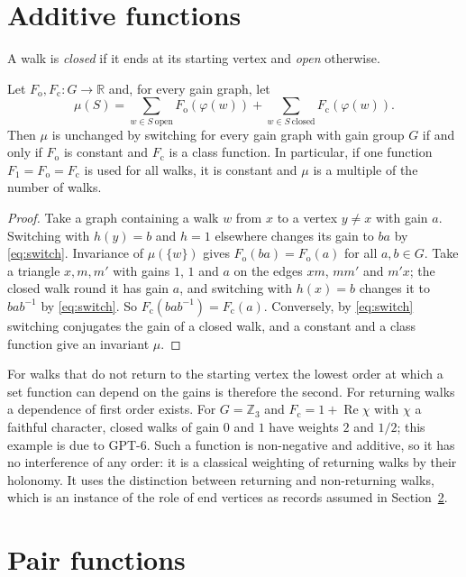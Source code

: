 \section{Additive functions}

A walk is \emph{closed} if it ends at its starting vertex and \emph{open} otherwise.

\begin{lemma}\label{lem:first}
Let $F_{\mathrm o},F_{\mathrm c}\colon G\to\mathbb{R}$ and, for every gain graph, let
\[
\mu(S)=\sum_{w\in S\ \mathrm{open}}F_{\mathrm o}(\varphi(w))+\sum_{w\in S\ \mathrm{closed}}F_{\mathrm c}(\varphi(w)).
\]
Then $\mu$ is unchanged by switching for every gain graph with gain group $G$ if and only if $F_{\mathrm o}$ is constant and $F_{\mathrm c}$ is a class function. In particular, if one function $F_1=F_{\mathrm o}=F_{\mathrm c}$ is used for all walks, it is constant and $\mu$ is a multiple of the number of walks.
\end{lemma}
\begin{proof}
Take a graph containing a walk $w$ from $x$ to a vertex $y\ne x$ with gain $a$. Switching with $h(y)=b$ and $h=1$ elsewhere changes its gain to $ba$ by \eqref{eq:switch}. Invariance of $\mu(\{w\})$ gives $F_{\mathrm o}(ba)=F_{\mathrm o}(a)$ for all $a,b\in G$. Take a triangle $x,m,m'$ with gains $1$, $1$ and $a$ on the edges $xm$, $mm'$ and $m'x$; the closed walk round it has gain $a$, and switching with $h(x)=b$ changes it to $bab^{-1}$ by \eqref{eq:switch}. So $F_{\mathrm c}(bab^{-1})=F_{\mathrm c}(a)$. Conversely, by \eqref{eq:switch} switching conjugates the gain of a closed walk, and a constant and a class function give an invariant $\mu$.
\end{proof}

For walks that do not return to the starting vertex the lowest order at which a set function can depend on the gains is therefore the second. For returning walks a dependence of first order exists. For $G=\mathbb{Z}_3$ and $F_{\mathrm c}=1+\operatorname{Re}\chi$ with $\chi$ a faithful character, closed walks of gain $0$ and $1$ have weights $2$ and $1/2$; this example is due to GPT-6. Such a function is non-negative and additive, so it has no interference of any order: it is a classical weighting of returning walks by their holonomy. It uses the distinction between returning and non-returning walks, which is an instance of the role of end vertices as records assumed in Section~\ref{sec:pair}.

\section{Pair functions}\label{sec:pair}

